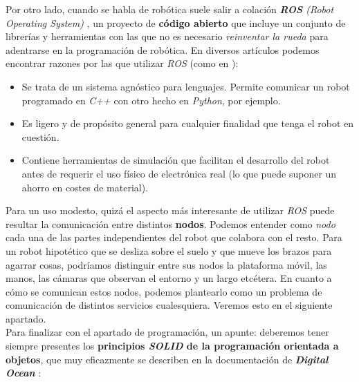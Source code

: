 Por otro lado, cuando se habla de robótica suele salir a colación \textit{\textbf{ROS} (Robot Operating System)} \cite{why-ros}, un proyecto de \textbf{código abierto} que incluye un conjunto de librerías y herramientas con las que no es necesario \textit{reinventar la rueda} para adentrarse en la programación de robótica. En diversos artículos podemos encontrar razones por las que utilizar \textit{ROS} (como en \cite{reasons-ros}):

\begin{itemize}
	\item Se trata de un sistema agnóstico para lenguajes. Permite comunicar un robot programado en \textit{C++} con otro hecho en \textit{Python}, por ejemplo.
	\item Es ligero y de propósito general para cualquier finalidad que tenga el robot en cuestión.
	\item Contiene herramientas de simulación que facilitan el desarrollo del robot antes de requerir el uso físico de electrónica real (lo que puede suponer un ahorro en costes de material).
\end{itemize}

Para un uso modesto, quizá el aspecto más interesante de utilizar \textit{ROS} puede resultar la comunicación entre distintos \textbf{nodos}. Podemos entender como \textit{nodo} cada una de las partes independientes del robot que colabora con el resto. Para un robot hipotético que se desliza sobre el suelo y que mueve los brazos para agarrar cosas, podríamos distinguir entre sus nodos la plataforma móvil, las manos, las cámaras que observan el entorno y un largo etcétera. En cuanto a cómo se comunican estos nodos, podemos plantearlo como un problema de comunicación de distintos servicios cualesquiera. Veremos esto en el siguiente apartado.\\

Para finalizar con el apartado de programación, un apunte: deberemos tener siempre presentes los \textbf{principios \textit{SOLID} de la programación orientada a objetos}, que muy eficazmente se describen en la documentación de \textbf{\textit{Digital Ocean}} \cite{solid}:

